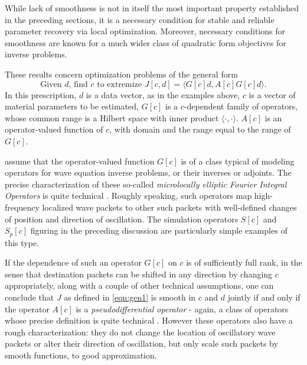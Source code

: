 While lack of smoothness is not in itself the most important property
established in the preceding sections, it is a necessary condition for
stable and reliable parameter recovery via local
optimization. Moreover, necessary conditions for smoothness are
known for a much wider class of quadratic form objectives for inverse
problems. 
  
These results
concern optimization problems of the general form
\begin{equation}
  \label{eqn:gen1}
  \mbox{Given }d\mbox{, find }c\mbox{ to extremize }
   J[c,d] = \langle G[c]d, A[c] G[c]d \rangle.
\end{equation}
In this prescription, $d$ is a data vector, as in the examples above,
$c$ is a vector of material parameters to be estimated, $G[c]$ is a
$c$-dependent family of operators, whose common range is a Hilbert
space with inner product $\langle \cdot, \cdot \rangle$.
$A[c]$ is an operator-valued function of $c$, with domain and the
range equal to the range of $G[c]$.

\cite{StolkSymes:03} assume that the
operator-valued function $G[c]$ is of a class typical of modeling
operators for wave equation inverse problems, or their inverses or
adjoints. The precise characterization of these so-called {\em microlocally elliptic Fourier Integral
Operators} is quite technical \cite[]{Dui:95}. Roughly speaking, such operators map high-frequency localized wave packets to other
such packets with well-defined changes of position and direction of
oscillation. The simulation operators $S[c]$ and $S_p[c]$ figuring in the preceding
discussion are particularly simple examples of this type.

If the dependence of such an operator $G[c]$ on $c$ is of sufficiently full rank, in
the sense that destination packets can be shifted in any direction by
changing $c$ appropriately, along with a couple of other technical
assumptions, one can conclude that $J$ as defined in \ref{eqn:gen1} is
smooth in $c$ and $d$ jointly if and only if the operator $A[c]$ is a 
{\em pseudodifferential operator} - again, a class of operators whose
precise definition is quite technical \cite[]{Dui:95,Tay:81}. However these operators also
have a rough characterization: they do not change the location of
oscillatory wave packets
or alter their direction of oscillation, but only scale such packets
by smooth functions, to good approximation. 

